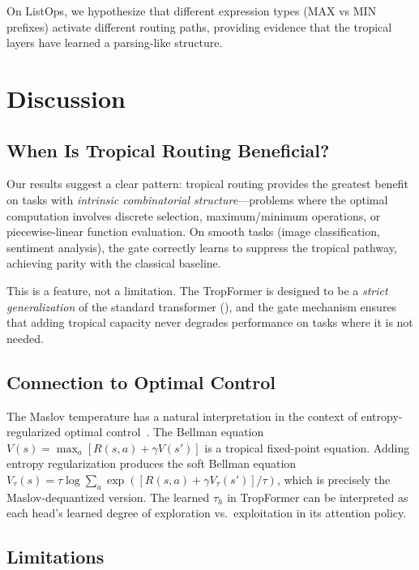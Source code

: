 \documentclass[11pt,twocolumn]{article}
\begin{document}
On ListOps, we hypothesize that different expression types (MAX vs MIN
prefixes) activate different routing paths, providing evidence that the
tropical layers have learned a parsing-like structure.

\section{Discussion}\label{sec:discussion}

\subsection{When Is Tropical Routing Beneficial?}

Our results suggest a clear pattern: tropical routing provides the greatest
benefit on tasks with \emph{intrinsic combinatorial structure}---problems
where the optimal computation involves discrete selection, maximum/minimum
operations, or piecewise-linear function evaluation. On smooth tasks (image
classification, sentiment analysis), the gate correctly learns to suppress the
tropical pathway, achieving parity with the classical baseline.

This is a feature, not a limitation. The TropFormer is designed to be a
\emph{strict generalization} of the standard transformer (),
and the gate mechanism ensures that adding tropical capacity never
degrades performance on tasks where it is not needed.

\subsection{Connection to Optimal Control}

The Maslov temperature has a natural interpretation in the context of
entropy-regularized optimal control~\cite{todorov2007linearly}. The Bellman
equation $V(s) = \max_a[R(s,a) + \gamma V(s')]$ is a tropical fixed-point
equation. Adding entropy regularization produces the soft Bellman equation
$V_\tau(s) = \tau \log \sum_a \exp([R(s,a) + \gamma V_\tau(s')]/\tau)$,
which is precisely the Maslov-dequantized version. The learned $\tau_h$ in
TropFormer can be interpreted as each head's learned degree of exploration
vs.\ exploitation in its attention policy.

\subsection{Limitations}
\end{document}
